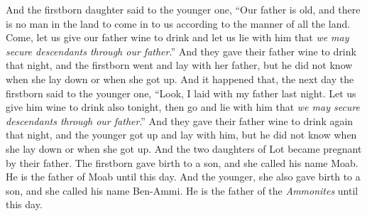\begin{biblechapter}
\verse And the firstborn daughter said to the younger one, “Our father is old, and there is no man in the land to come in to us according to the manner of all the land.
\verse Come, let us give our father wine to drink and let us lie with him that \textit{we may secure descendants through our father}.”
\verse And they gave their father wine to drink that night, and the firstborn went and lay with her father, but he did not know when she lay down or when she got up.
\verse And it happened that, the next day the firstborn said to the younger one, “Look, I laid with my father last night. Let us give him wine to drink also tonight, then go and lie with him that \textit{we may secure descendants through our father}.”
\verse And they gave their father wine to drink again that night, and the younger got up and lay with him, but he did not know when she lay down or when she got up.
\verse And the two daughters of Lot became pregnant by their father.
\verse The firstborn gave birth to a son, and she called his name Moab. He is the father of Moab until this day.
\verse And the younger, she also gave birth to a son, and she called his name Ben-Ammi. He is the father of the \textit{Ammonites} until this day.
\end{biblechapter}

